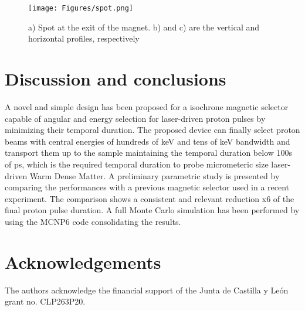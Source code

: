 \documentclass{cup-hpl}
\begin{document}
\begin{figure}[t]
	\centering
		\texttt{[image: Figures/spot.png]}%
	\caption{a) Spot at the exit of the magnet. b) and c) are the vertical and horizontal profiles, respectively}
\label{spot}
\end{figure}

\begin{comment}
\subsection{Measuring of proton pulse duration}
A possible application of the advanced design of PIS is the measure of the proton pulse duration via X-ray streak technique \cite{Malko2021}. The experimental setup is shown in figure \ref{Experiment_pulse_duration}.

\begin{figure}[t]
	\centering
		\texttt{[image: Figures/Diagram\_3.png]}%
	\caption{Experimental setup for pulse duration measurement}
\label{Experiment_pulse_duration}
\end{figure}
\end{comment}

\section{Discussion and conclusions}
A novel and simple design has been proposed for a isochrone magnetic selector capable of angular and energy selection for laser-driven proton pulses by minimizing their temporal duration. The proposed device can finally select proton beams with central energies of hundreds of keV and tens of keV bandwidth and transport them up to the sample maintaining the temporal duration below 100s of ps, which is the required temporal duration to probe micrometeric size laser-driven Warm Dense Matter. A preliminary parametric study is presented by comparing the performances with a previous magnetic selector used in a recent experiment. The comparison shows a consistent and relevant reduction x6 of the final proton pulse duration. A full Monte Carlo simulation has been performed by using the MCNP6 code \cite{mcnpx} consolidating the results. 

\section*{Acknowledgements}
The authors acknowledge the financial support of the Junta de Castilla y Le\'on grant no. CLP263P20.


{}
\end{document}
